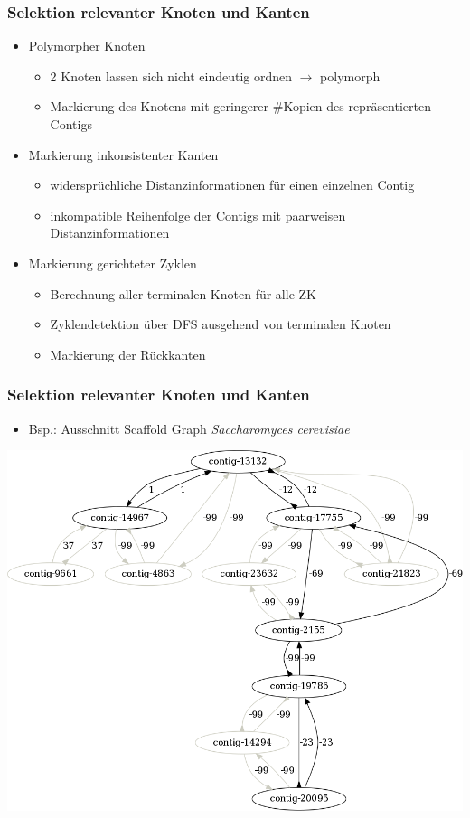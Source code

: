 \documentclass[xcolor=pst]{beamer}
\begin{document}
\begin{frame}
  \frametitle{Selektion relevanter Knoten und Kanten}
  \begin{itemize}
    \item Polymorpher Knoten
    \begin{itemize}
      \item 2 Knoten lassen sich nicht eindeutig ordnen $\rightarrow$ polymorph
      \item Markierung des Knotens mit geringerer \#Kopien des repräsentierten Contigs
    \end{itemize}
    \item Markierung inkonsistenter Kanten
    \begin{itemize}
      \item widersprüchliche Distanzinformationen für einen einzelnen Contig
      \item inkompatible Reihenfolge der Contigs mit paarweisen Distanzinformationen
    \end{itemize}
    \item Markierung gerichteter Zyklen
    \begin{itemize}
      \item Berechnung aller terminalen Knoten für alle ZK
      \item Zyklendetektion über DFS ausgehend von terminalen Knoten
      \item Markierung der Rückkanten
    \end{itemize}
  \end{itemize}
\end{frame}

\begin{frame}
  \frametitle{Selektion relevanter Knoten und Kanten}
  \begin{itemize}
    \item Bsp.: Ausschnitt Scaffold Graph \textit{Saccharomyces cerevisiae}
  \end{itemize}
  \begin{center}
    \includegraphics[scale=0.25]{figures/s_cerevisiae_filter_example_small.png}
  \end{center}
\end{frame}
\end{document}
